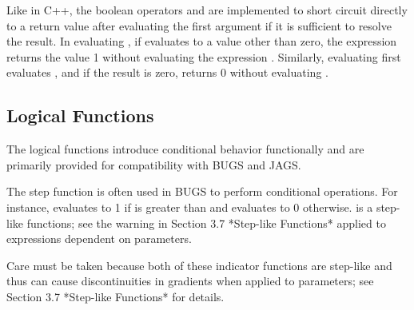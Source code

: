 \begin{description}
\begin{description}
\begin{description}
\begin{description}
\begin{description}
\begin{description}
\begin{description}
\begin{description}
Like in C++, the boolean operators \code{&&} and \code{||} are implemented to short circuit directly to a return value after evaluating the first argument if it is sufficient to resolve the result.  In evaluating , if  evaluates to a value other than zero, the expression returns the value 1 without evaluating the expression .  Similarly, evaluating  first evaluates , and if the result is zero, returns 0 without evaluating .

\subsection{Logical Functions}

The logical functions introduce conditional behavior functionally and are primarily provided for compatibility with BUGS and JAGS.

\begin{description}   %

 The step function is often used in BUGS to perform conditional operations.  For instance,  evaluates to 1 if  is greater than  and evaluates to 0 otherwise.  is a step-like functions; see the warning in Section 3.7 *Step-like Functions* applied to expressions dependent on parameters.

\begin{description}   %



\begin{description}   %

 Care must be taken because both of these indicator functions are step-like and thus can cause discontinuities in gradients when applied to parameters; see Section 3.7 *Step-like Functions* for details.


\end{description}
\end{description}
\end{description}
\end{description}
\end{description}
\end{description}
\end{description}
\end{description}
\end{description}
\end{description}
\end{description}
